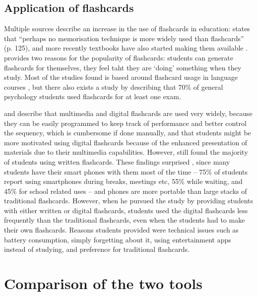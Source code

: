
\subsection{Application of flashcards}

Multiple sources describe an increase in the use of flashcards in education:  states that ``perhaps no memorisation technique is more widely used than flashcards'' (p. 125), and more recently textbooks have also started making them available \cite{burgess, golding}.  provides two reasons for the popularity of flashcards: students can generate flashcards for themselves, they feel taht they are `doing' something when they study. Most of the studies found is based around flashcard usage in language courses \cite{nakata, joseph, chien}, but there also exists a study by  describing that 70\% of general psychology students used flashcards for at least one exam.

 and  describe that multimedia and digital flashcards are used very widely, because they can be easily programmed to keep track of performance and better control the sequency, which is cumbersome if done manually, and that students might be more motivated using digital flashcards because of the enhanced presentation of materials due to their multimedia capabilities. However,  still found the majority of students using written flashcards. These findings surprised , since many students have their smart phones with them most of the time -- 75\% of students report using smartphones during breaks, meetings etc, 55\% while waiting, and 45\% for school related uses -- and phones are more portable than large stacks of traditional flashcards. However, when he pursued the study by providing students with either written or digital flashcards, students used the digital flashcards less frequently than the traditional flashcards, even when the students had to make their own flashcards. Reasons students provided were technical issues such as battery consumption, simply forgetting about it, using entertainment apps instead of studying, and preference for traditional flashcards.


\section{Comparison of the two tools}


